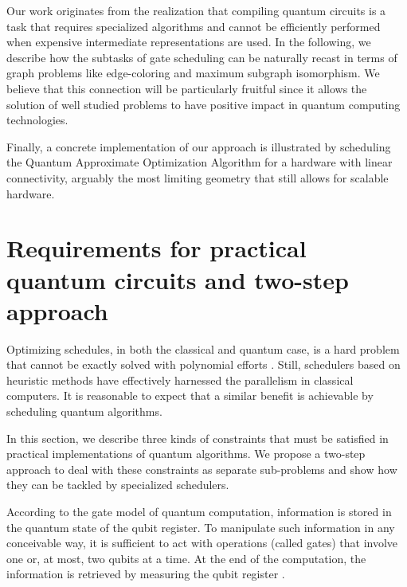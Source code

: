 \documentclass[%
onecolumn,pra,
superscriptaddress,
nofootinbib,
 amsmath,amssymb,
 aps,
11pt,
]{revtex4-1}
\def\note#1{\textbf{\color{red}[#1]}}
\begin{document}
Our work originates from the realization that compiling quantum circuits is a task that requires specialized algorithms and cannot be efficiently performed when expensive intermediate representations are used. In the following, we describe how the subtasks of gate scheduling can be naturally recast in terms of graph problems like edge-coloring and maximum subgraph isomorphism. We believe that this connection will be particularly fruitful since it allows the solution of well studied problems to have positive impact in quantum computing technologies.

Finally, a concrete implementation of our approach is illustrated by scheduling the Quantum Approximate Optimization Algorithm for a hardware with linear connectivity, arguably the most limiting geometry that still allows for scalable hardware.



\section{Requirements for practical quantum circuits and two-step approach}
\label{sec:two-step}

Optimizing schedules, in both the classical and quantum case, is a hard problem that cannot be exactly solved with polynomial efforts \cite{Ozer1998,graham1966bounds}.
Still, schedulers based on heuristic methods have effectively harnessed the parallelism in classical computers. It is reasonable to expect that a similar benefit is achievable by scheduling quantum algorithms.

In this section, we describe three kinds of constraints that must be satisfied in practical implementations of quantum algorithms. We propose a two-step approach to deal with these constraints as separate sub-problems and show how they can be tackled by specialized schedulers.

According to the gate model of quantum computation, information is stored in the quantum state of the qubit register. To manipulate such information in any conceivable way, it is sufficient to act with operations (called gates) that involve one or, at most, two qubits at a time. At the end of the computation, the information is retrieved by measuring the qubit register%
.
\end{document}
